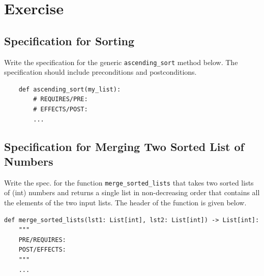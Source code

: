 \documentclass[oneside,11pt,dvipsnames]{book}
\newcommand{\sol}[1]{\iftoggle{usesol}{\textbf{Sol:} #1}{}}
\newcommand{\code}[1]{\texttt{#1}}
\begin{document}

\section{Exercise}

\subsection{Specification for Sorting}\label{exercise:specs-sort}
Write the specification for the generic \code{ascending\_sort} method below. The specification should include preconditions and postconditions.
\begin{lstlisting}
    def ascending_sort(my_list):
        # REQUIRES/PRE: 
        # EFFECTS/POST: 
        ...
\end{lstlisting}
    

\subsection{Specification for Merging Two Sorted List of Numbers}\label{exercise:specs-merge-lists}
Write the spec. for the function \code{merge\_sorted\_lists} that takes two sorted lists of (int) numbers and returns a single list in non-decreasing order that contains all the elements of the two input lists. The header of the function is given below.

\begin{lstlisting}
def merge_sorted_lists(lst1: List[int], lst2: List[int]) -> List[int]:
    """
    PRE/REQUIRES: 
    POST/EFFECTS: 
    """
    ...
\end{lstlisting}

\sol{ 
    \begin{itemize}
    \item PRE/REQUIRES:
        \begin{itemize}
            \item `lst1` and `lst2` are not null.
            \item `lst1` and `lst2` contain only numbers
            \item `lst1` and `lst2` are sorted.
        \end{itemize}
    \item POST/EFFECTS: The returned list is a single sorted list in non-decreasing order containing all the elements
    of `lst1` and `lst2`.
    \end{itemize}
}
\end{document}

